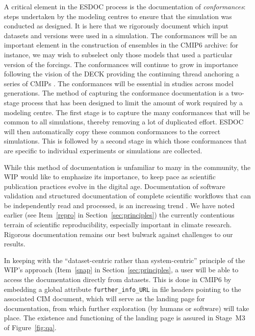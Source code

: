 \documentclass[gmd,manuscript]{copernicus}
\newcommand{\figref}[1] {\mbox{Figure   \ref{fig:#1}}}
\newcommand{\secref}[1] {\mbox{Section  \ref{sec:#1}}}
\begin{document}
A critical element in the ESDOC process is the documentation of
\emph{conformances}: steps undertaken by the modeling centres to
ensure that the simulation was conducted as designed. It is here that
we rigorously document which input datasets and versions \citep[e.g the
forcing datasets, see][]{ref:duracketal2017} were used in a
simulation. The conformances will be an important element in the
construction of ensembles in the CMIP6 archive: for instance, we may
wish to subselect only those models that used a particular version of
the forcings. The conformances will continue to grow in importance
following the vision of the DECK providing the continuing thread
anchoring a series of CMIPs \citep[viz. the well-known Figure~1
of][]{ref:eyringetal2016a}. The conformances will be essential in
studies across model generations.
The method of capturing the conformance documentation is a two-stage
process that has been designed to limit the amount of work required by
a modeling centre. The first stage is to capture the many conformances
that will be common to all simulations, thereby removing a lot of
duplicated effort. ESDOC will then automatically copy these common
conformances to the correct simulations. This is followed by a second
stage in which those conformances that are specific to individual
experiments or simulations are collected.

While this method of documentation is unfamiliar to many in the
community, the WIP would like to emphasize its importance, to keep
pace as scientific publication practices evolve in the digital age.
Documentation of software validation \citep[see e.g][]{ref:peng2011}
and structured documentation of complete scientific workflows that can
be independently read and processed, is an increasing trend \citep[see
the special issue on the ``Geoscience Paper of the Future'',
][]{ref:davidetal2016}. We have noted earlier (see Item~\ref{repro} in
\secref{principles}) the currently contentious terrain of scientific
reproducibility, especially important in climate research. Rigorous
documentation remains our best bulwark against challenges to our results.

In keeping with the ``dataset-centric rather than system-centric''
principle of the WIP's approach (Item~\ref{snap} in
\secref{principles}, a user will be able to access the documentation
directly from datasets. This is done in CMIP6 by embedding a global
attribute \texttt{further\_info\_URL} in file headers pointing to the
associated CIM document, which will serve as the landing page for
documentation, from which further exploration (by humans or software)
will take place. The existence and functioning of the landing page is
assured in Stage~M3 of \figref{qa}.
\end{document}
